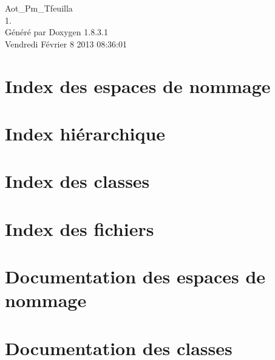 \documentclass{book}
\begin{document}
\hypersetup{pageanchor=false,citecolor=blue}
\begin{titlepage}
\vspace*{7cm}
\begin{center}
{\Large Aot\-\_\-\-Pm\-\_\-\-Tfeuilla \\[1ex]\large 1. }\\
\vspace*{1cm}
{\large Généré par Doxygen 1.8.3.1}\\
\vspace*{0.5cm}
{\small Vendredi Février 8 2013 08:36:01}\\
\end{center}
\end{titlepage}
\clearemptydoublepage
{}
\tableofcontents
\clearemptydoublepage
{}
\hypersetup{pageanchor=true,citecolor=blue}
\chapter{Index des espaces de nommage}

\chapter{Index hiérarchique}

\chapter{Index des classes}

\chapter{Index des fichiers}

\chapter{Documentation des espaces de nommage}





\chapter{Documentation des classes}

















\end{document}
